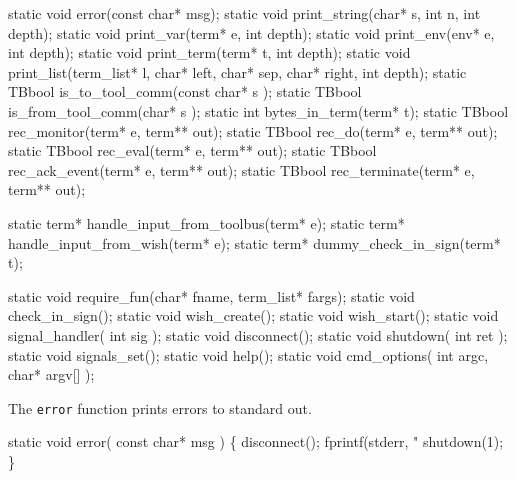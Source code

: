 \nwenddocs{}\endmoddef\nwstartdeflinemarkup{}\nwenddeflinemarkup
static void error(const char* msg);
static void print_string(char* s, int n, int depth);
static void print_var(term* e, int depth);
static void print_env(env* e, int depth);
static void print_term(term* t, int depth);
static void print_list(term_list* l, char* left, char* sep, char* right, int depth);
static TBbool is_to_tool_comm(const char* s );
static TBbool is_from_tool_comm(char* s );
static int bytes_in_term(term* t);
static TBbool rec_monitor(term* e, term** out);
static TBbool rec_do(term* e, term** out);
static TBbool rec_eval(term* e, term** out);
static TBbool rec_ack_event(term* e, term** out);
static TBbool rec_terminate(term* e, term** out);

static term*  handle_input_from_toolbus(term* e);
static term*  handle_input_from_wish(term* e);
static term*  dummy_check_in_sign(term* t);

static void require_fun(char* fname, term_list* fargs);
static void check_in_sign();
static void wish_create();
static void wish_start();
static void signal_handler( int sig );
static void disconnect();
static void shutdown( int ret );
static void signals_set();
static void help();
static void cmd_options( int argc, char* argv[] );
\nwendcode{}\nwdocspar



The {\tt error} function prints errors to standard out.

\nwenddocs{}\endmoddef\let\nwnotused=\nwoutput{}\nwstartdeflinemarkup{}\nwenddeflinemarkup
static void error( const char* msg )
\{
   disconnect();
   fprintf(stderr, "%
   shutdown(1);
\}
\nwendcode{}\nwdocspar


